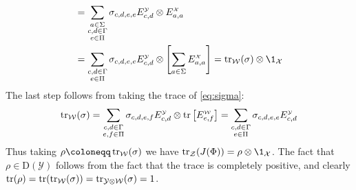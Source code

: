 \documentclass[boxes,pages,color=SeaGreen]{homework}
\newcommand{\X}{\mathcal{X}}
\newcommand{\Y}{\mathcal{Y}}
\newcommand{\Z}{\mathcal{Z}}
\newcommand{\W}{\mathcal{W}}
\newcommand{\Density}{\mathrm{D}}
\begin{document}
\begin{solution}
\begin{align*}
                        & = \sum_{\substack{a\in\Sigma                                                                                                                                                                            \\ c,d\in\Gamma \\ e\in\Pi}}\sigma_{c,d,e,e}\standmat{c,d}{\Y}\otimes \standmat{a,a}{\X} \\
                        & = \sum_{\substack{c,d\in\Gamma                                                                                                                                                                          \\ e\in\Pi}}\sigma_{c,d,e,e}\standmat{c,d}{\Y}\otimes \qty[\sum_{a\in\Sigma}\standmat{a,a}{\X}] = \tr_\W(\sigma)\otimes\1_\X
    \end{align*}
    The last step follows from taking the trace of \cref{eq:sigma}:
    \begin{equation*}
        \tr_\W(\sigma) = \sum_{\substack{c,d\in\Gamma \\ e,f \in\Pi}}\sigma_{c,d,e,f}\standmat{c,d}{\Y} \otimes \tr\qty[\standmat{e,f}{\W}] = \sum_{\substack{c,d\in\Gamma \\ e \in\Pi}}\sigma_{c,d,e,e}\standmat{c,d}{\Y}
    \end{equation*}
    Thus taking $\rho\defeq\tr_\W(\sigma)$ we have $\tr_\Z(J(\Phi)) = \rho\otimes\1_\X$.
    The fact that $\rho\in\Density(\Y)$ follows from the fact that the trace is completely positive, and clearly $\tr(\rho) = \tr(\tr_\W(\sigma)) = \tr_{\Y\otimes\W}(\sigma) = 1$.


\end{solution}
\end{document}

